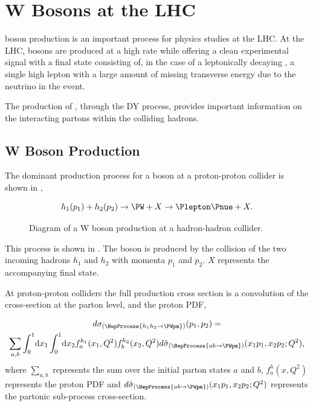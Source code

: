 \chapter[W Bosons]{W Bosons at the LHC}

\PW boson production is an important process for physics studies at the LHC.  At
the \ac{LHC}, \PW bosons are produced at a high rate while offering a clean
experimental signal with a final state consisting of, in the case of a
leptonically decaying \PW, a single high \PT lepton with a large amount of
missing transverse energy due to the neutrino in the event. 

The production of \PW, through the \ac{DY} process, provides important
information on the interacting partons within the colliding hadrons.

\section{W Boson Production}

The dominant production process for a \PW boson at a proton-proton collider is
shown in ,

\begin{equation}
  h_1(p_1) + h_2(p_2)
  \to 
  \PW + X
  \to
  \Plepton \Pnue + X.
  \label{wbos:wprod}
\end{equation}

\begin{figure}[htbp]
  \centering
  \caption{Diagram of a W boson production at a hadron-hadron collider.}
  \label{wbos:wproddiag}
\end{figure}

This process is shown in . 
The \PW boson is produced by the collision of the two incoming hadrons $h_1$
and $h_2$ with momenta $p_1$ and $p_2$. 
$X$ represents the accompanying final state.

At proton-proton colliders the full \PW production cross section is a
convolution of the cross-section at the parton level, and the proton \ac{PDF},

\begin{multline}
  d\sigma_{(\HepProcess{h_1 h_2 \to \PWpm})}(p_1,p_2) = \\
  \sum\limits_{a,b}
  \int_0^1 \! \mathrm{d} x_1 
  \int_0^1 \! \mathrm{d} x_2 
  f_a^{h_1}(x_1,Q^2)
  f_b^{h_2}(x_2,Q^2) 
  d\hat{\sigma}_{(\HepProcess{a b \to \PWpm})}(x_1 p_1, x_2 p_2; Q^2),
  \label{wbos:xsec}
\end{multline}
where $\sum\limits_{a,b}$ represents the sum over the initial parton states $a$
and $b$, $f_a^{h}(x,Q^2)$ represents the proton \ac{PDF} and
$d\hat{\sigma}_{(\HepProcess{a b \to \PWpm})}(x_1 p_1, x_2 p_2; Q^2)$
represents the partonic sub-process cross-section.

